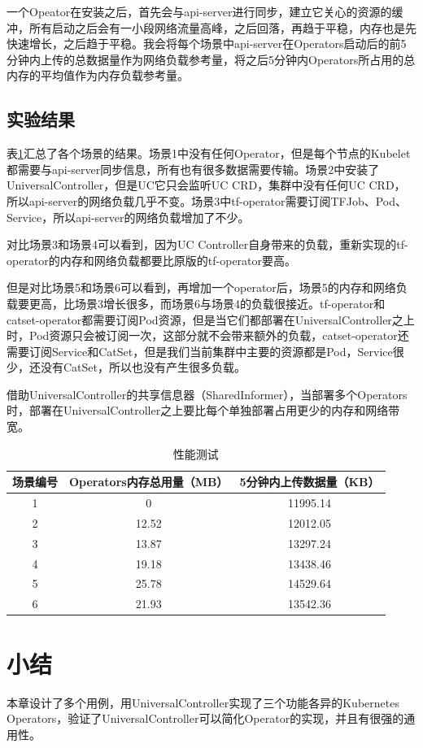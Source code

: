 \documentclass[macfonts,master]{njuthesis}
\begin{document}
一个Opeator在安装之后，首先会与api-server进行同步，建立它关心的资源的缓冲，所有启动之后会有一小段网络流量高峰，之后回落，再趋于平稳，内存也是先快速增长，之后趋于平稳。我会将每个场景中api-server在Operators启动后的前5分钟内上传的总数据量作为网络负载参考量，将之后5分钟内Operators所占用的总内存的平均值作为内存负载参考量。

\subsection{实验结果}
表\ref{table:test}汇总了各个场景的结果。场景1中没有任何Operator，但是每个节点的Kubelet都需要与api-server同步信息，所有也有很多数据需要传输。场景2中安装了UniversalController，但是UC它只会监听UC CRD，集群中没有任何UC CRD，所以api-server的网络负载几乎不变。场景3中tf-operator需要订阅TFJob、Pod、Service，所以api-server的网络负载增加了不少。

对比场景3和场景4可以看到，因为UC Controller自身带来的负载，重新实现的tf-operator的内存和网络负载都要比原版的tf-operator要高。

但是对比场景5和场景6可以看到，再增加一个operator后，场景5的内存和网络负载要更高，比场景3增长很多，而场景6与场景4的负载很接近。tf-operator和catset-operator都需要订阅Pod资源，但是当它们都部署在UniversalController之上时，Pod资源只会被订阅一次，这部分就不会带来额外的负载，catset-operator还需要订阅Service和CatSet，但是我们当前集群中主要的资源都是Pod，Service很少，还没有CatSet，所以也没有产生很多负载。

借助UniversalController的共享信息器（SharedInformer），当部署多个Operators时，部署在UniversalController之上要比每个单独部署占用更少的内存和网络带宽。
\begin{table}
  \centering
  \begin{tabular}{ccc}
    \toprule
    \textbf{场景编号} & \textbf{Operators内存总用量（MB）} & \textbf{5分钟内上传数据量（KB）} \\
    \midrule
    1  & 0 & 11995.14 \\
    2  & 12.52  &  12012.05 \\
    3  & 13.87  & 13297.24 \\
    4  & 19.18 &  13438.46 \\
    5  & 25.78  & 14529.64 \\
    6  & 21.93  & 13542.36 \\
    \bottomrule
  \end{tabular}
  \caption{性能测试}\label{table:test}
\end{table}

\section{小结}
本章设计了多个用例，用UniversalController实现了三个功能各异的Kubernetes Operators，验证了UniversalController可以简化Operator的实现，并且有很强的通用性。
\end{document}
